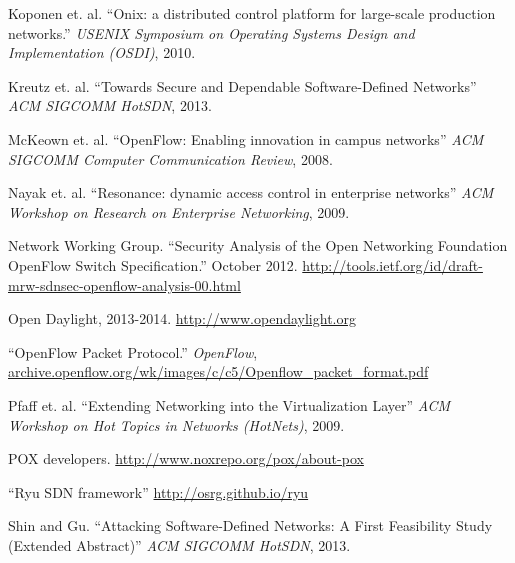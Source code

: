 {\begin{thebibliography}{99}
 Koponen et. al. ``Onix: a distributed control platform for large-scale production networks.'' \emph{USENIX Symposium on Operating Systems Design and Implementation (OSDI)}, 2010.

 Kreutz et. al. ``Towards Secure and Dependable Software-Defined Networks'' \emph{ACM SIGCOMM HotSDN}, 2013.

 McKeown et. al. ``OpenFlow: Enabling innovation in campus networks'' \emph{ACM SIGCOMM Computer Communication Review}, 2008.

 Nayak et. al. ``Resonance: dynamic access control in enterprise networks'' \emph{ACM Workshop on Research on Enterprise Networking}, 2009.

 Network Working Group. ``Security Analysis of the Open Networking Foundation OpenFlow Switch Specification.'' October 2012. \url{http://tools.ietf.org/id/draft-mrw-sdnsec-openflow-analysis-00.html}

 Open Daylight, 2013-2014. \url{http://www.opendaylight.org}

 ``OpenFlow Packet Protocol.'' \emph{OpenFlow}, \url{archive.openflow.org/wk/images/c/c5/Openflow_packet_format.pdf}

 Pfaff et. al. ``Extending Networking into the Virtualization Layer'' \emph{ACM Workshop on Hot Topics in Networks (HotNets)}, 2009.

 POX developers. \url{http://www.noxrepo.org/pox/about-pox}


 ``Ryu SDN framework'' \url{http://osrg.github.io/ryu}

 Shin and Gu. ``Attacking Software-Defined Networks: A First Feasibility Study (Extended Abstract)'' \emph{ACM SIGCOMM HotSDN}, 2013.


\end{thebibliography}
}
